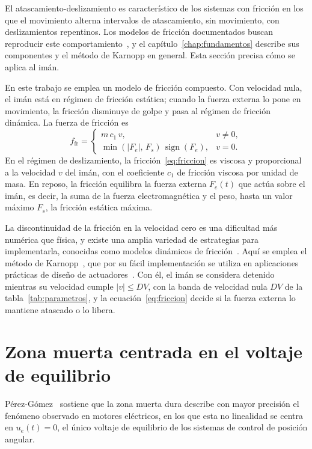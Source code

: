 El atascamiento-deslizamiento es característico de los sistemas con fricción en los que el movimiento alterna intervalos de atascamiento, sin movimiento, con deslizamientos repentinos. Los modelos de fricción documentados buscan reproducir este comportamiento~\cite{armstrong,olsson,berman}, y el capítulo~\ref{chap:fundamentos} describe sus componentes y el método de Karnopp en general. Esta sección precisa cómo se aplica al imán.

En este trabajo se emplea un modelo de fricción compuesto. Con velocidad nula, el imán está en régimen de fricción estática; cuando la fuerza externa lo pone en movimiento, la fricción disminuye de golpe y pasa al régimen de fricción dinámica. La fuerza de fricción es
\begin{equation}
f_{\text{fr}} =
\begin{cases}
m\,c_1\,v,
& v \neq 0, \\[6pt]
\min\!\left(|F_e|,\,F_s\right)\,\operatorname{sign}(F_e),
& v = 0 .
\end{cases}
\label{eq:friccion}
\end{equation}
En el régimen de deslizamiento, la fricción~\eqref{eq:friccion} es viscosa y proporcional a la velocidad $v$ del imán, con el coeficiente $c_1$ de fricción viscosa por unidad de masa. En reposo, la fricción equilibra la fuerza externa $F_e(t)$ que actúa sobre el imán, es decir, la suma de la fuerza electromagnética y el peso, hasta un valor máximo $F_s$, la fricción estática máxima.

La discontinuidad de la fricción en la velocidad cero es una dificultad más numérica que física, y existe una amplia variedad de estrategias para implementarla, conocidas como modelos dinámicos de fricción~\cite{haessig}. Aquí se emplea el método de Karnopp~\cite{karnopp}, que por su fácil implementación se utiliza en aplicaciones prácticas de diseño de actuadores~\cite{liu,ravanbod,ravanbod1,bicakci,romano}. Con él, el imán se considera detenido mientras su velocidad cumple $|v| \le DV$, con la banda de velocidad nula $DV$ de la tabla~\ref{tab:parametros}, y la ecuación~\eqref{eq:friccion} decide si la fuerza externa lo mantiene atascado o lo libera.

\section{Zona muerta centrada en el voltaje de equilibrio}\label{sec:zm_modelo}

Pérez-Gómez~\cite{perez} sostiene que la zona muerta dura describe con mayor precisión el fenómeno observado en motores eléctricos, en los que esta no linealidad se centra en $u_e(t) = 0$, el único voltaje de equilibrio de los sistemas de control de posición angular.

